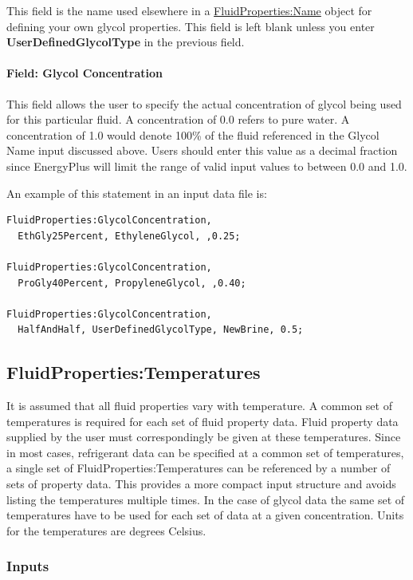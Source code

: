 This field is the name used elsewhere in a \hyperref[fluidpropertiesname]{FluidProperties:Name} object for defining your own glycol properties. This field is left blank unless you enter \textbf{UserDefinedGlycolType} in the previous field.

\paragraph{Field: Glycol Concentration}\label{field-glycol-concentration}

This field allows the user to specify the actual concentration of glycol being used for this particular fluid. A concentration of 0.0 refers to pure water. A concentration of 1.0 would denote 100\% of the fluid referenced in the Glycol Name input discussed above. Users should enter this value as a decimal fraction since EnergyPlus will limit the range of valid input values to between 0.0 and 1.0.

An example of this statement in an input data file is:

\begin{lstlisting}
FluidProperties:GlycolConcentration,
  EthGly25Percent, EthyleneGlycol, ,0.25;

FluidProperties:GlycolConcentration,
  ProGly40Percent, PropyleneGlycol, ,0.40;

FluidProperties:GlycolConcentration,
  HalfAndHalf, UserDefinedGlycolType, NewBrine, 0.5;
\end{lstlisting}

\subsection{FluidProperties:Temperatures}\label{fluidpropertiestemperatures}

It is assumed that all fluid properties vary with temperature. A common set of temperatures is required for each set of fluid property data. Fluid property data supplied by the user must correspondingly be given at these temperatures. Since in most cases, refrigerant data can be specified at a common set of temperatures, a single set of FluidProperties:Temperatures can be referenced by a number of sets of property data. This provides a more compact input structure and avoids listing the temperatures multiple times. In the case of glycol data the same set of temperatures have to be used for each set of data at a given concentration. Units for the temperatures are degrees Celsius.

\subsubsection{Inputs}\label{inputs-2-017}

